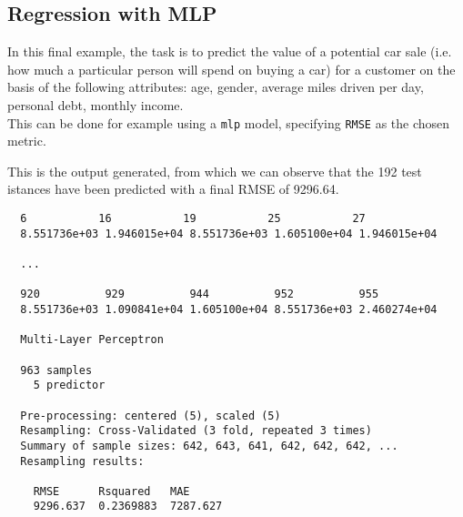 \documentclass{article}
\begin{document}
\pagebreak

\subsection{Regression with MLP}
In this final example, the task is to predict the value of a potential car sale (i.e. how much a particular person will spend on buying a car) for a customer on the basis of the following attributes: age, gender, average miles driven per day, personal debt, monthly income.\\

This can be done for example using a \texttt{mlp} model, specifying \texttt{RMSE} as the chosen metric.\\



\pagebreak

This is the output generated, from which we can observe that the 192 test istances have been predicted with a final RMSE of 9296.64.\\

\begin{lstlisting}
  6           16           19           25           27           
  8.551736e+03 1.946015e+04 8.551736e+03 1.605100e+04 1.946015e+04 

  ...

  920          929          944          952          955 
  8.551736e+03 1.090841e+04 1.605100e+04 8.551736e+03 2.460274e+04 

  Multi-Layer Perceptron 
  
  963 samples
    5 predictor
  
  Pre-processing: centered (5), scaled (5) 
  Resampling: Cross-Validated (3 fold, repeated 3 times) 
  Summary of sample sizes: 642, 643, 641, 642, 642, 642, ... 
  Resampling results:
  
    RMSE      Rsquared   MAE     
    9296.637  0.2369883  7287.627
\end{lstlisting}
\end{document}
